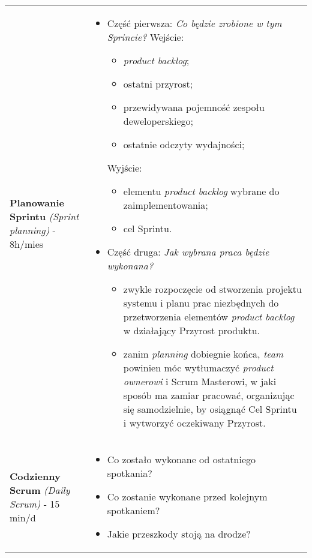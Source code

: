 \documentclass[../main.tex]{subfiles}
\begin{document}
\begin{table}[H]
\begin{center}
\begin{tabular}{ p{} p{} }
                \cmidrule(r){1-1}\cmidrule(l){2-2}
                \textbf{Planowanie Sprintu} \textit{(Sprint planning)} - 8h/mies
                &
                \begin{itemize}
                    \item Część pierwsza: \textit{Co będzie zrobione w tym Sprincie?}
                    Wejście:
                    \begin{itemize}
                        \item \textit{product backlog};
                        \item ostatni przyrost;
                        \item przewidywana pojemność zespołu deweloperskiego;
                        \item ostatnie odczyty wydajności;
                    \end{itemize}
                    Wyjście:
                    \begin{itemize}
                        \item elementu \textit{product backlog}
                        wybrane do zaimplementowania;
                        \item cel Sprintu.
                    \end{itemize}
                    \item Część druga: \textit{Jak wybrana praca będzie wykonana?}
                    \begin{itemize}
                        \item zwykle rozpoczęcie od stworzenia projektu systemu i planu prac
                        niezbędnych do przetworzenia elementów \textit{product backlog} w działający Przyrost produktu.
                        \item zanim \textit{planning} dobiegnie końca, \textit{team}
                        powinien móc wytłumaczyć \textit{product ownerowi} i Scrum Masterowi,
                        w jaki sposób ma zamiar pracować, organizując się samodzielnie, by osiągnąć Cel
                        Sprintu i wytworzyć oczekiwany Przyrost.
                    \end{itemize}
                \end{itemize}
                \\

                \cmidrule(r){1-1}\cmidrule(l){2-2}
                \textbf{Codzienny Scrum} \textit{(Daily Scrum)} - 15 min/d
                &
                \begin{itemize}
                    \item Co zostało wykonane od ostatniego spotkania?
                    \item Co zostanie wykonane przed kolejnym spotkaniem?
                    \item Jakie przeszkody stoją na drodze?
                \end{itemize}
                \\


\end{tabular}
\end{center}
\end{table}
\end{document}
